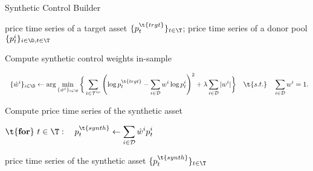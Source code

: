 \begin{algorithm}[H]
\caption{Synthetic Control Builder}
\label{alg:synth_control_builder}
\begin{algorithmic}[1]
\Require
price time series of a target asset $\{p^{\t{trgt}}_{t}\}_{t \in \T}$;
price time series of a donor pool $\{p^{i}_{t}\}_{i\in\D, t \in \T}$

\mx
\State Compute synthetic control weights in-sample

$\displaystyle
~~\{ \hat w^{i} \}_{i\in \D}
\gets  \arg \min_
{\{ \hat w^i \}_{i\in\D}}
\bigg{\{}
\sum_{t\in \mathcal T^{tr}}
\left(
\log p_{t}^\t{trgt}
- 
\sum_{i\in \mathcal D}
w^i \log p_{t}^i
\right)^2
+ 
\lambda \sum_{i\in\mathcal D} |w^i|
\bigg{\}}
\quad 
\t{s.t.}
\quad 
\sum_{i\in\mathcal D} w^i=1
.
$


\bx
\State Compute price time series of the synthetic asset

$\displaystyle
\t{\textbf{for}}~{t\in\T}: \quad 
p^{\t{synth}}_t \gets  
\sum_{i\in \mathcal D} \hat w^i p_{t}^i 
$
    
\mx 
\Ensure price time series of the synthetic asset 
$\{ p^{\t{synth}}_t \}_{t\in\T}$
\end{algorithmic}
\end{algorithm}
